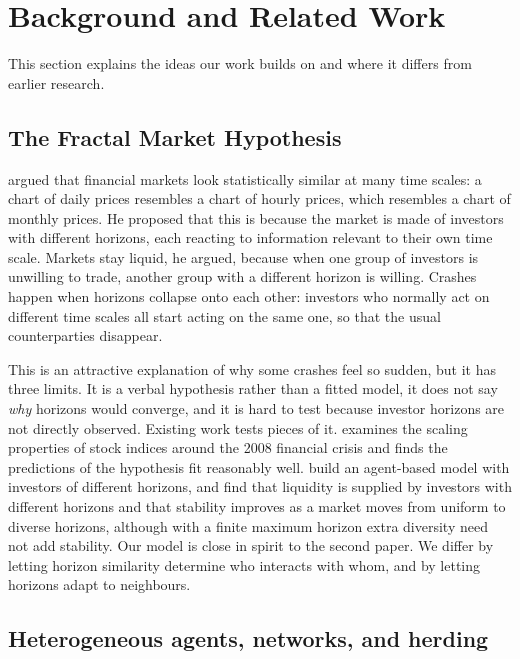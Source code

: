 \section{Background and Related Work}
\label{sec:background}

This section explains the ideas our work builds on and where it differs from earlier research.

\subsection{The Fractal Market Hypothesis}

\citet{peters1994} argued that financial markets look statistically similar at many time scales: a chart of daily prices resembles a chart of hourly prices, which resembles a chart of monthly prices. He proposed that this is because the market is made of investors with different horizons, each reacting to information relevant to their own time scale. Markets stay liquid, he argued, because when one group of investors is unwilling to trade, another group with a different horizon is willing. Crashes happen when horizons collapse onto each other: investors who normally act on different time scales all start acting on the same one, so that the usual counterparties disappear.

This is an attractive explanation of why some crashes feel so sudden, but it has three limits. It is a verbal hypothesis rather than a fitted model, it does not say \emph{why} horizons would converge, and it is hard to test because investor horizons are not directly observed. Existing work tests pieces of it. \citet{kristoufek2012} examines the scaling properties of stock indices around the 2008 financial crisis and finds the predictions of the hypothesis fit reasonably well. \citet{li2014} build an agent-based model with investors of different horizons, and find that liquidity is supplied by investors with different horizons and that stability improves as a market moves from uniform to diverse horizons, although with a finite maximum horizon extra diversity need not add stability. Our model is close in spirit to the second paper. We differ by letting horizon similarity determine who interacts with whom, and by letting horizons adapt to neighbours.

\subsection{Heterogeneous agents, networks, and herding}

